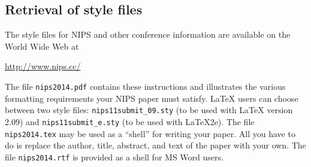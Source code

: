 \documentclass{article} %
\begin{document}







\subsection{Retrieval of style files}

The style files for NIPS and other conference information are available on the World Wide Web at
\begin{center}
   \url{http://www.nips.cc/}
\end{center}
The file \verb+nips2014.pdf+ contains these 
instructions and illustrates the
various formatting requirements your NIPS paper must satisfy. \LaTeX{}
users can choose between two style files:
\verb+nips11submit_09.sty+ (to be used with \LaTeX{} version 2.09) and
\verb+nips11submit_e.sty+ (to be used with \LaTeX{}2e). The file
\verb+nips2014.tex+ may be used as a ``shell'' for writing your paper. All you
have to do is replace the author, title, abstract, and text of the paper with
your own. The file
\verb+nips2014.rtf+ is provided as a shell for MS Word users.
\end{document}
